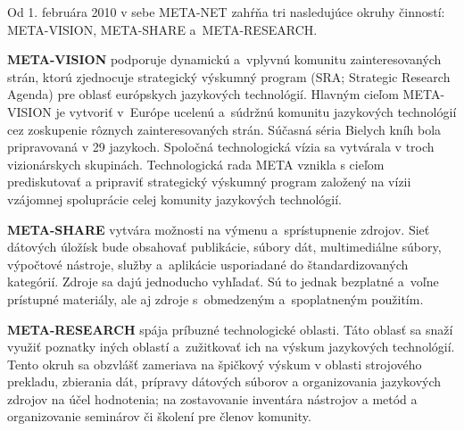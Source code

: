 \noindent  Od 1. februára 2010 v sebe META-NET zahŕňa tri nasledujúce okruhy činností: META-VISION, META-SHARE a~META-RESEARCH. 

{\bf META-VISION} podporuje dynamickú a~vplyvnú komunitu zainteresovaných strán, ktorú zjednocuje strategický výskumný program (SRA; Strategic Research Agenda) pre oblasť európskych jazykových technológií. Hlavným cieľom META-VISION je vytvoriť v~Európe ucelenú a~súdržnú komunitu jazykových technológií cez zoskupenie rôznych zainteresovaných strán. Súčasná séria Bielych kníh bola pripravovaná v 29 jazykoch. Spoločná technologická vízia sa vytvárala v troch vizionárskych skupinách. Technologická rada META vznikla s cieľom prediskutovať a pripraviť strategický výskumný program založený na vízii vzájomnej spoluprácie celej komunity jazykových technológií.

{\bf META-SHARE} vytvára možnosti na výmenu a~sprístupnenie zdrojov. Sieť dátových úložísk bude obsahovať publikácie, súbory dát, multimediálne súbory, výpočtové nástroje, služby a~aplikácie usporiadané do štandardizovaných kategórií. Zdroje sa dajú jednoducho vyhľadať. Sú to jednak bezplatné a~voľne prístupné materiály, ale aj zdroje s~obmedzeným a~spoplatneným použitím. 

{\bf META-RESEARCH} spája príbuzné technologické oblasti. Táto oblasť sa snaží využiť poznatky iných oblastí a~zužitkovať ich na výskum jazykových technológií. Tento okruh sa obzvlášť zameriava na špičkový výskum v oblasti strojového prekladu, zbierania dát, prípravy dátových súborov a organizovania jazykových zdrojov na účel hodnotenia; na zostavovanie inventára nástrojov a metód a organizovanie seminárov či školení pre členov komunity. 




